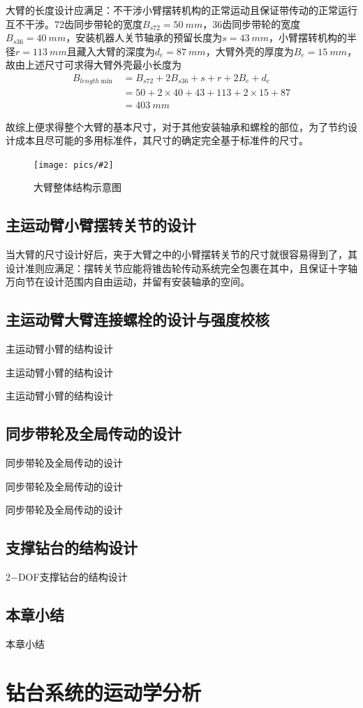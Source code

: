 \documentclass[UTF8]{article}%
\newcommand{\p}[4][0.5]{\begin{figure}[h]\centering\texttt{[image: pics/\#2]}\\\caption{#3}\label{#4}\end{figure}}%
\newcommand{\n}{\par}%
\begin{document}
\begin{spacing}{1.5}
	大臂的长度设计应满足：不干涉小臂摆转机构的正常运动且保证带传动的正常运行互不干涉。72齿同步带轮的宽度$B_{s72}=\SI{50}{mm}$，36齿同步带轮的宽度$B_{s36}=\SI{40}{mm}$，安装机器人关节轴承的预留长度为$s=\SI{43}{mm}$，小臂摆转机构的半径$r=\SI{113}{mm}$且藏入大臂的深度为$d_e=\SI{87}{mm}$，大臂外壳的厚度为$B_e=\SI{15}{mm}$，故由上述尺寸可求得大臂外壳最小长度为
	\begin{align*}
		B_{length\min}&=B_{s72}+2B_{s36}+s+r+2B_e+d_e\\
		&=50+2\times40+43+113+2\times15+87\\
		&=\SI{403}{mm}
	\end{align*}\n
	故综上便求得整个大臂的基本尺寸，对于其他安装轴承和螺栓的部位，为了节约设计成本且尽可能的多用标准件，其尺寸的确定完全基于标准件的尺寸。\n
	\p[0.12]{大臂整体结构示意图.PDF}{大臂整体结构示意图}{dbsy}\n
	\subsection{主运动臂小臂摆转关节的设计}
	当大臂的尺寸设计好后，夹于大臂之中的小臂摆转关节的尺寸就很容易得到了，其设计准则应满足：摆转关节应能将锥齿轮传动系统完全包裹在其中，且保证十字轴万向节在设计范围内自由运动，并留有安装轴承的空间。
	\subsection{主运动臂大臂连接螺栓的设计与强度校核}
	主运动臂小臂的结构设计\n
	主运动臂小臂的结构设计\n
	主运动臂小臂的结构设计\n
	\subsection{同步带轮及全局传动的设计}
	同步带轮及全局传动的设计\n
	同步带轮及全局传动的设计\n
	同步带轮及全局传动的设计\n
	\subsection{支撑钻台的结构设计}
	2$-$DOF支撑钻台的结构设计
	\subsection{本章小结}
	本章小结
\section{钻台系统的运动学分析}

\end{spacing}
\end{document}
